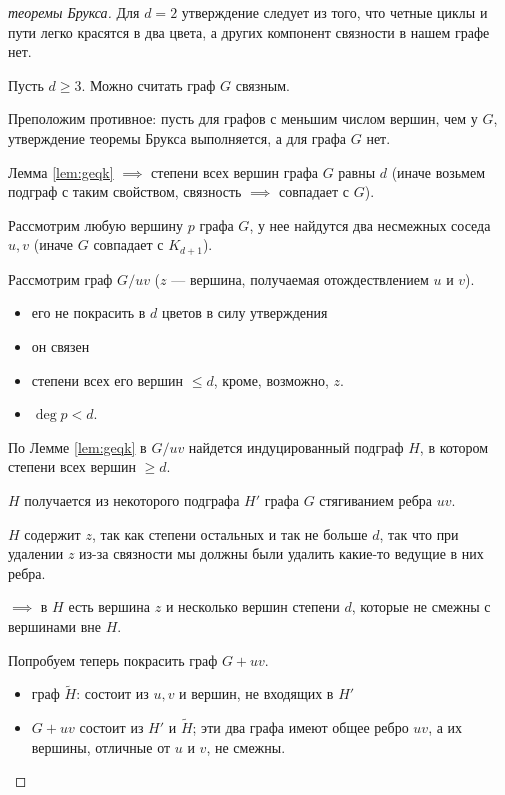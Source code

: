 \begin{proof}[ теоремы Брукса]

    Для $d = 2$ утверждение следует из того, что четные циклы и пути легко красятся в два цвета, а других компонент связности в нашем графе нет.

    Пусть $d \geq 3$. Можно считать граф $G$ связным.

    Преположим противное: пусть для графов с меньшим числом вершин, чем у $G$, утверждение теоремы Брукса выполняется, а для графа $G$ нет.

    Лемма \ref*{lem:geqk}    $\implies$ степени всех вершин графа $G$ равны $d$ (иначе возьмем подграф с таким свойством, связность $\implies$ совпадает с $G$).

    Рассмотрим любую вершину $p$ графа $G$, у нее найдутся два несмежных соседа $u, v$ (иначе $G$ совпадает с $K_{d+1}$).

    Рассмотрим граф $G / uv$ ($z$ --- вершина, получаемая отождествлением $u$ и $v$).
    \begin{itemize}
        \item его не покрасить в $d$ цветов в силу утверждения
        \item он связен
        \item степени всех его вершин $\leq d$, кроме, возможно, $z$.
        \item $\deg{p} < d$.
    \end{itemize}

    По Лемме \ref*{lem:geqk} в $G / uv$ найдется индуцированный подграф $H$, в котором степени всех вершин $\geq d$.

    $H$ получается из некоторого подграфа $H'$ графа $G$ стягиванием ребра $uv$.

    $H$ содержит $z$, так как степени остальных и так не больше $d$, так что при удалении $z$ из-за связности мы должны были удалить какие-то ведущие в них ребра.

    $\implies$ в $H$ есть вершина $z$ и несколько вершин степени $d$, которые не смежны с вершинами вне $H$.

    Попробуем теперь покрасить граф $G + uv$.
    \begin{itemize}
        \item граф $\tilde{H}$: состоит из $u, v$ и вершин, не входящих в $H'$
        
        \item $G + uv$ состоит из $H'$ и $\tilde{H}$; эти два графа имеют общее ребро $uv$, а их вершины, отличные от $u$ и $v$, не смежны.
        

\end{itemize}
\end{proof}
